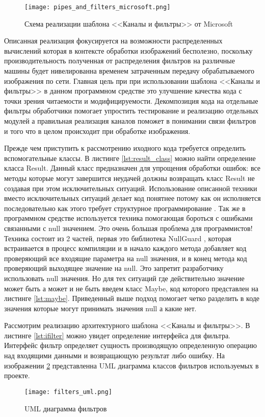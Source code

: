 \begin{figure}[ht] 
    \centering
    \texttt{[image: pipes\_and\_filters\_microsoft.png]}  
    \caption{Схема реализации шаблона <<Каналы и фильтры>> от Microsoft}
    \label{fig:creation:pipes_and_filters_microsoft}
\end{figure}

Описанная реализация фокусируется на возможности распределенных вычислений которая в контексте обработки изображений бесполезно, поскольку производительность полученная от распределения фильтров на различные машины будет нивелированна временем затраченным передачу обрабатываемого изображения по сети. Главная цель при при использовании шаблона <<Каналы и фильтры>> в данном программном средстве это улучшение качества кода с точки зрения читаемости и модифицируемости. Декомпозиция кода на отдельные фильтры обработчики помогает упростить тестирование и реализацию отдельных модулей а правильная реализация каналов поможет в понимании связи фильтров и того что в целом происходит при обработке изображения. 

Прежде чем приступить к рассмотрению иходного кода требуется определить вспомогательные классы. 
В листинге \ref{lst:result_class} можно найти определение класса Result. Данный класс предназначен для упрощения обработки ошибок: все методы которые могут завершится неудачей должны возвращать класс Result не создавая при этом исключительных ситуаций. Использование описанной техники вместо исключительных ситуаций делает код понятнее потому как он исполняется последовательно как этого требует структурное программирование \cite{structured_programming}. Так же в программном средстве используется техника помогающая бороться с ошибками связанными с null значением. Это очень большая проблема для программистов! Техника состоит из 2 частей, первая это библиотека NullGuard \cite{null_guard}, которая встраивается в процесс компиляции и в начало каждого метода добавляет код проверяющий все входящие параметра на null значения, и в конец метода код проверяющий выходящее значение на null. Это запретит разработчику использовать null значения. Но для тех ситуаций где действительно значение может быть а может и не быть введем класс Maybe, код которого представлен на листинге \ref{lst:maybe}. Приведенный выше подход помогает четко разделить в коде значения которые могут принимать значения null а какие нет.

Рассмотрим реализацию архитектурного шаблона <<Каналы и фильтры>>. В листинге \ref{lst:ifilter} можно увидет определение интерфейса для фильтра. 
Интерфейс фильтр определяет сущность производящую определенную операцию над входящими данными и возвращающую результат либо ошибку. На изображении \ref{fig:creation:filters_uml} представленна UML диаграмма классов фильтров используемых в проекте.
\begin{figure}[ht] 
    \centering
    \texttt{[image: filters\_uml.png]}  
    \caption{UML диаграмма фильтров}
    \label{fig:creation:filters_uml}
\end{figure}

